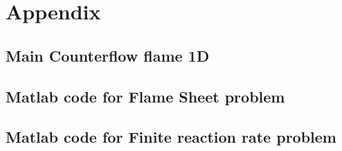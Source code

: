 \chapter{Appendix}	\label{ch:appendix}
\glsresetall
\section{Main Counterflow flame 1D}

\section{Matlab code for Flame Sheet problem}

\section{Matlab code for Finite reaction rate problem}

